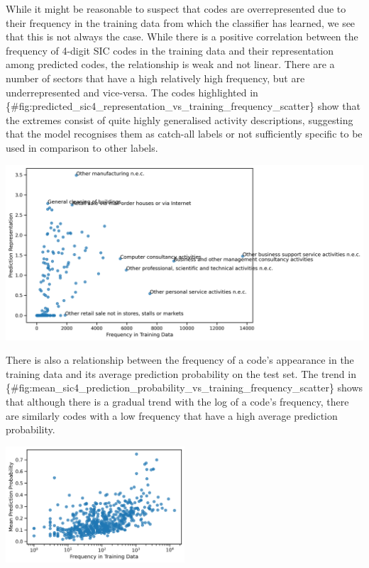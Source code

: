 \documentclass[
]{article}
\begin{document}
While it might be reasonable to suspect that codes are overrepresented
due to their frequency in the training data from which the classifier
has learned, we see that this is not always the case. While there is a
positive correlation between the frequency of 4-digit SIC codes in the
training data and their representation among predicted codes, the
relationship is weak and not linear. There are a number of sectors that
have a high relatively high frequency, but are underrepresented and
vice-versa. The codes highlighted in
\{\#fig:predicted\_sic4\_representation\_vs\_training\_frequency\_scatter\}
show that the extremes consist of quite highly generalised activity
descriptions, suggesting that the model recognises them as catch-all
labels or not sufficiently specific to be used in comparison to other
labels.

\includegraphics{../../figures/predicted_sic4_representation_vs_training_frequency_scatter.png}

There is also a relationship between the frequency of a code's
appearance in the training data and its average prediction probability
on the test set. The trend in
\{\#fig:mean\_sic4\_prediction\_probability\_vs\_training\_frequency\_scatter\}
shows that although there is a gradual trend with the log of a code's
frequency, there are similarly codes with a low frequency that have a
high average prediction probability.

\includegraphics[width=0.5\textwidth,height=\textheight]{../../figures/mean_sic4_prediction_probability_vs_training_frequency_scatter.png}
\end{document}
